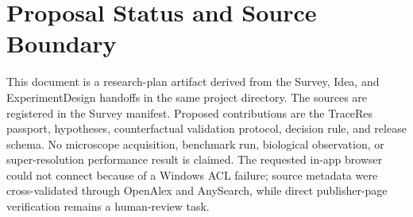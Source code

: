 \documentclass[conference]{IEEEtran}
\begin{document}
\section{Proposal Status and Source Boundary}

This document is a research-plan artifact derived from the Survey, Idea, and ExperimentDesign handoffs in the same project directory. The sources are registered in the Survey manifest. Proposed contributions are the TraceRes passport, hypotheses, counterfactual validation protocol, decision rule, and release schema. No microscope acquisition, benchmark run, biological observation, or super-resolution performance result is claimed. The requested in-app browser could not connect because of a Windows ACL failure; source metadata were cross-validated through OpenAlex and AnySearch, while direct publisher-page verification remains a human-review task.
\end{document}
